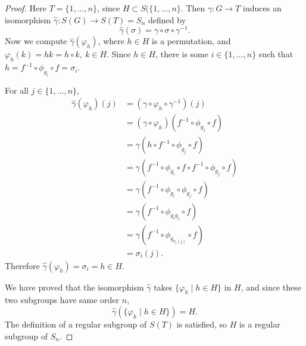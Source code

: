 \documentclass[11pt,a4paper]{article}
\begin{document}
\begin{proof}
Here $T = \{1,\ldots,n\}$, since $H \subset S(\{1,\ldots,n\}$. Then $\gamma : G \to T$ induces an isomorphism $\hat \gamma : S(G) \to S(T) = S_n$ defined by 
$$\hat \gamma(\sigma) =\gamma \circ \sigma \circ \gamma^{-1}.$$
Now we compute $\hat \gamma (\varphi_h)$, where $h \in H$ is a permutation, and $\varphi_h(k) = hk = h \circ k,\ k\in H$. 
Since $h \in H$, there is some $i \in \{1,\ldots,n\}$ such that $h = f^{-1} \circ \phi_{g_i} \circ f =\sigma_i$.

For all $j \in \{1,\ldots,n\}$,
\begin{align*}
\hat \gamma (\varphi_h)(j) &= (\gamma \circ \varphi_h \circ \gamma^{-1})(j)\\
&= (\gamma \circ \varphi_h)(f^{-1} \circ \phi_{g_j} \circ f)\\
&= \gamma(h \circ f^{-1} \circ \phi_{g_j} \circ f)\\
&= \gamma(f^{-1} \circ \phi_{g_i} \circ f \circ f^{-1} \circ \phi_{g_j} \circ f)\\
&=\gamma(f^{-1}  \circ \phi_{g_i}\circ \phi_{g_j} \circ f)\\
&= \gamma(f^{-1}  \circ \phi_{g_i g_j} \circ f)\\
&= \gamma(f^{-1}  \circ \phi_{g_{\sigma_i(j)}} \circ f)\\
&=\sigma_i(j).
\end{align*}
Therefore $\hat \gamma (\varphi_h) = \sigma_i = h\in H$.

We have proved that the isomorphism $\hat \gamma$ takes $\{\varphi_h \mid h \in H\}$ in $H$, and since these two subgroups have same order $n$,
$$\hat \gamma(\{\varphi_h \mid h \in H\}) = H.$$
The definition of a regular subgroup of $S(T)$ is satisfied, so $H$ is a regular subgroup of $S_n$.
  \end{proof}
 
\end{document}
